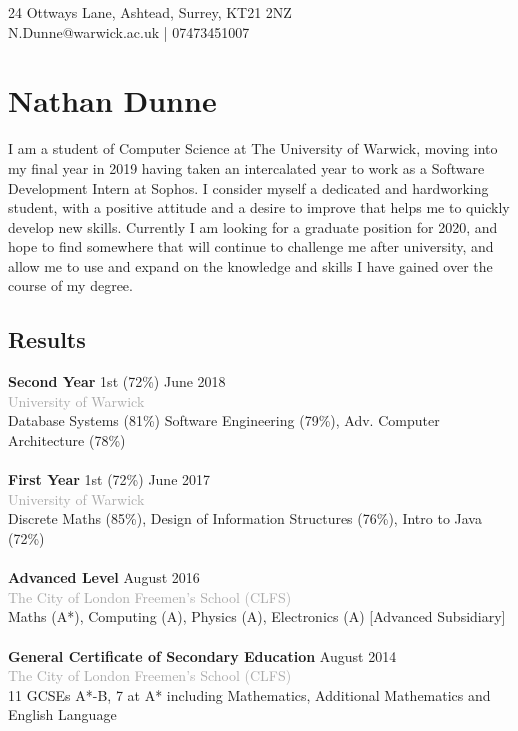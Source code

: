 \documentclass[11pt]{article}
\newcommand{\linesep}{\noindent\makebox[\linewidth]{\rule{\linewidth}{0.2pt}}}
\begin{document}
\hspace*{\fill} 24 Ottways Lane, Ashtead, Surrey, KT21 2NZ \\
\hspace*{\fill} N.Dunne@warwick.ac.uk | 07473451007
\section*{Nathan Dunne}

I am a student of Computer Science at The University of Warwick, moving into my final year in 2019 having taken an intercalated year to work as a Software Development Intern at Sophos. I consider myself a dedicated and hardworking student, with a positive attitude and a desire to improve that helps me to quickly develop new skills. Currently I am looking for a graduate position for 2020, and hope to find somewhere that will continue to challenge me after university, and allow me to use and expand on the knowledge and skills I have gained over the course of my degree.

\linesep
\subsection*{Results}

\textbf{Second Year} \hfill 1st (72\%) \hfill June 2018 \\
\textcolor{darkgray}{University of Warwick} \\
\hspace*{4ex}Database Systems (81\%) Software Engineering (79\%), Adv. Computer Architecture (78\%)
\\\\
\textbf{First Year} \hfill \hspace{1em} 1st (72\%) \hfill June 2017 \\    
\textcolor{darkgray}{University of Warwick} \\
\hspace*{4ex}Discrete Maths (85\%), Design of Information Structures (76\%), Intro to Java (72\%)
\\\\
\textbf{Advanced Level} \hfill August 2016 \\
\textcolor{darkgray}{The City of London Freemen’s School (CLFS)} \\                    
\hspace*{4ex}Maths (A*), Computing (A), Physics (A), Electronics (A) [Advanced Subsidiary]
\\\\
\textbf{General Certificate of Secondary Education} \hfill August 2014 \\
\textcolor{darkgray}{The City of London Freemen’s School (CLFS)} \\  
\hspace*{4ex}11 GCSEs A*-B, 7 at A* including Mathematics, Additional Mathematics and English Language
\\
 \linesep
\end{document}

